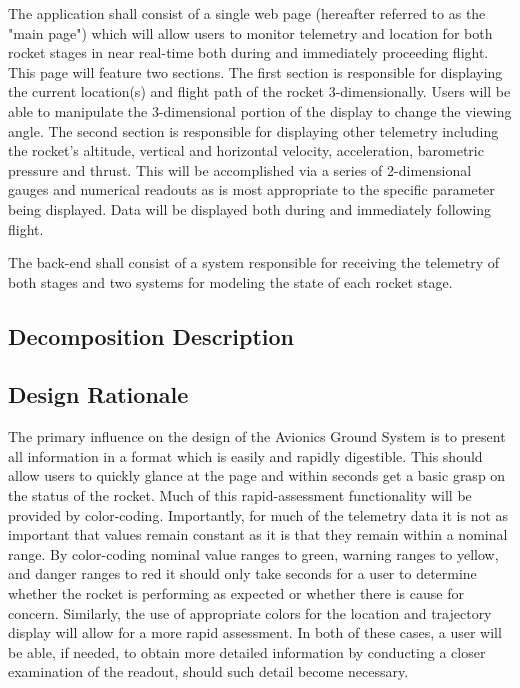 \documentclass[journal,10pt,onecolumn,compsoc]{IEEEtran}
\begin{document}
		\noindent The application shall consist of a single web page (hereafter referred to as the "main page") which will allow users to monitor telemetry and location for both rocket stages in near real-time both during and immediately proceeding flight.
		This page will feature two sections.
		The first section is responsible for displaying the current location(s) and flight path of the rocket 3-dimensionally.
		Users will be able to manipulate the 3-dimensional portion of the display to change the viewing angle.
		The second section is responsible for displaying other telemetry including the rocket’s altitude, vertical and horizontal velocity, acceleration, barometric pressure and thrust.
		This will be accomplished via a series of 2-dimensional gauges and numerical readouts as is most appropriate to the specific parameter being displayed.
		Data will be displayed both during and immediately following flight.

		\noindent The back-end shall consist of a system responsible for receiving the telemetry of both stages and two systems for modeling the state of each rocket stage.

		
	\subsection{Decomposition Description}


	\subsection{Design Rationale}
		\noindent The primary influence on the design of the Avionics Ground System is to present all information in a format which is easily and rapidly digestible.
		This should allow users to quickly glance at the page and within seconds get a basic grasp on the status of the rocket.
		Much of this rapid-assessment functionality will be provided by color-coding.
		Importantly, for much of the telemetry data it is not as important that values remain constant as it is that they remain within a nominal range. 
		By color-coding nominal value ranges to green, warning ranges to yellow, and danger ranges to red it should only take seconds for a user to determine whether the rocket is performing as expected or whether there is cause for concern.
		Similarly, the use of appropriate colors for the location and trajectory display will allow for a more rapid assessment.
		In both of these cases, a user will be able, if needed, to obtain more detailed information by conducting a closer examination of the readout, should such detail become necessary.
\end{document}
